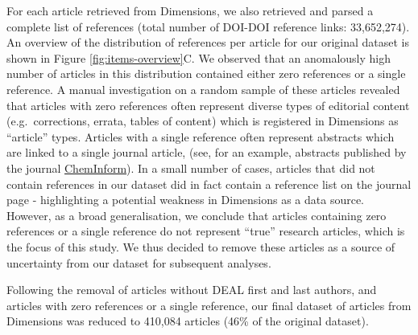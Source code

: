 \documentclass[
]{article}
\begin{document}
For each article retrieved from Dimensions, we also retrieved and parsed a complete list of references (total number of DOI-DOI reference links: 33,652,274). An overview of the distribution of references per article for our original dataset is shown in Figure \ref{fig:items-overview}C. We observed that an anomalously high number of articles in this distribution contained either zero references or a single reference. A manual investigation on a random sample of these articles revealed that articles with zero references often represent diverse types of editorial content (e.g.~corrections, errata, tables of content) which is registered in Dimensions as ``article'' types. Articles with a single reference often represent abstracts which are linked to a single journal article, (see, for an example, abstracts published by the journal \href{https://onlinelibrary.wiley.com/journal/15222667}{ChemInform}). In a small number of cases, articles that did not contain references in our dataset did in fact contain a reference list on the journal page - highlighting a potential weakness in Dimensions as a data source. However, as a broad generalisation, we conclude that articles containing zero references or a single reference do not represent ``true'' research articles, which is the focus of this study. We thus decided to remove these articles as a source of uncertainty from our dataset for subsequent analyses.

Following the removal of articles without DEAL first and last authors, and articles with zero references or a single reference, our final dataset of articles from Dimensions was reduced to 410,084 articles (46\% of the original dataset).
\end{document}
